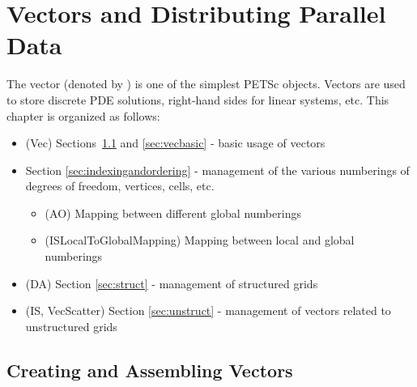 %
%

\chapter{Vectors and Distributing Parallel Data} 
\label{chapter:vectors}

The vector (denoted by ) is one of the simplest PETSc
objects.  Vectors are used to store discrete PDE solutions, right-hand
sides for linear systems, etc. This chapter is organized as follows:

\begin{itemize}
\item (Vec) Sections~\ref{sec:veccreate} and \ref{sec:vecbasic} - basic usage of vectors
\item Section \ref{sec:indexingandordering} - management of the various numberings of
               degrees of freedom, vertices, cells, etc.
  \begin{itemize} 
  \item (AO) Mapping between different global numberings
  \item (ISLocalToGlobalMapping) Mapping between local and global numberings
  \end{itemize}
\item (DA) Section \ref{sec:struct} - management of structured grids
\item (IS, VecScatter) Section \ref{sec:unstruct} - management of vectors related to unstructured grids
\end{itemize}

\section{Creating and Assembling Vectors}
\label{sec:veccreate}

